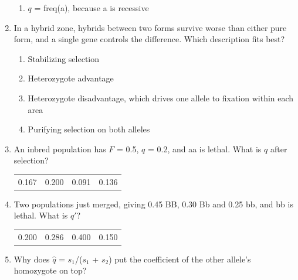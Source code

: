\documentclass[11pt]{article}
\newcommand{\work}[1]{\par\vspace{#1}}
\begin{document}
\begin{enumerate}[label=\textbf{\arabic*.}, leftmargin=2em, itemsep=1.4em]
\begin{enumerate}[label={}, leftmargin=2.4em, labelwidth=0pt, itemsep=2pt, topsep=0pt]
\item \hspace*{-2.4em}\(q\) = freq(a), because a is recessive
\end{enumerate}
\item In a hybrid zone, hybrids between two forms survive worse than either pure form, and a single gene controls the difference. Which description fits best?
\par\smallskip
\begin{enumerate}[label={}, leftmargin=2.4em, labelwidth=0pt, itemsep=2pt, topsep=0pt]
\item \hspace*{-2.4em}Stabilizing selection
\item \hspace*{-2.4em}Heterozygote advantage
\item \hspace*{-2.4em}Heterozygote disadvantage, which drives one allele to fixation within each area
\item \hspace*{-2.4em}Purifying selection on both alleles
\end{enumerate}
\item An inbred population has \(F\) = 0.5, \(q\) = 0.2, and aa is lethal. What is \(q\) after selection?
\par\smallskip\noindent\begin{tabularx}{\linewidth}{@{}YYYY@{}}
0.167 & 0.200 & 0.091 & 0.136 \\
\end{tabularx}
\work{1.6cm}
\item Two populations just merged, giving 0.45 BB, 0.30 Bb and 0.25 bb, and bb is lethal. What is \(q'\)?
\par\smallskip\noindent\begin{tabularx}{\linewidth}{@{}YYYY@{}}
0.200 & 0.286 & 0.400 & 0.150 \\
\end{tabularx}
\work{1.6cm}
\item Why does \(\hat{q}\) = \(s_1\)/(\(s_1\) + \(s_2\)) put the coefficient of the other allele's homozygote on top?

\end{enumerate}
\end{document}
